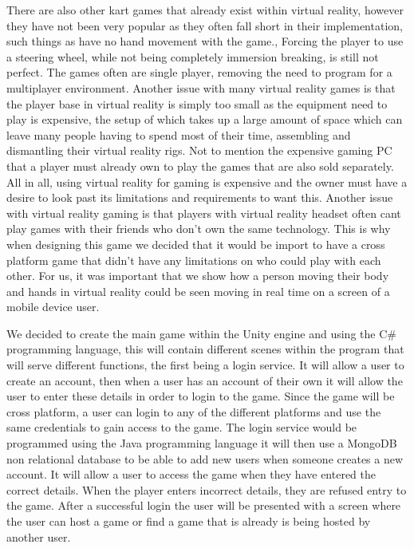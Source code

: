 There are also other kart games that already exist within virtual reality, however they have not been very popular as they often fall short in their implementation, such things as have no hand movement with the game., Forcing the player to use a steering wheel, while not being completely immersion breaking, is still not perfect. The games often are single player, removing the need to program for a multiplayer environment. Another issue with many virtual reality games is that the player base in virtual reality is simply too small as the equipment need to play is expensive, the setup of which takes up a large amount of space which can leave many people having to spend most of their time, assembling and dismantling their virtual reality rigs. Not to mention the expensive gaming PC that a player must already own to play the games that are also sold separately. All in all, using virtual reality for gaming is expensive and the owner must have a desire to look past its limitations and requirements to want this. Another issue with virtual reality gaming is that players with virtual reality headset often cant play games with their friends who don't own the same technology. This is why when designing this game we decided that it would be import to have a cross platform game that didn't have any limitations on who could play with each other. For us, it was important that we show how a person moving their body and hands in virtual reality could be seen moving in real time on a screen of a mobile device user. 
\newline

We decided to create the main game within the Unity engine and using the C# programming language, this will contain different scenes within the program that will serve different functions, the first being a login service. It will allow a user to create an account, then when a user has an account of their own it will allow the user to enter these details in order to login to the game. Since the game will be cross platform, a user can login to any of the different platforms and use the same credentials to gain access to the game. The login service would be programmed using the Java programming language it will then use a MongoDB non relational database to be able to add new users when someone creates a new account. It will allow a user to access the game when they have entered the correct details. When the player enters incorrect details, they are refused entry to the game. After a successful login the user will be presented with a screen where the user can host a game or find a game that is already is being hosted by another user.\newline  

